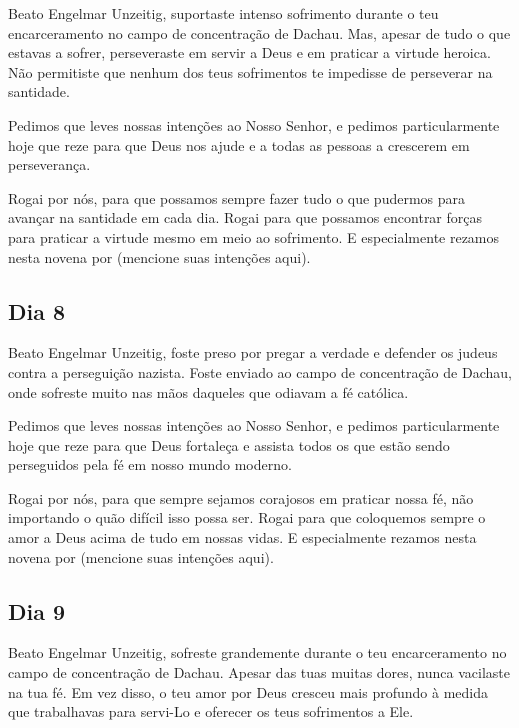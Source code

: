 \documentclass[a4paper,14pt]{extarticle} \usepackage[utf8]{inputenc}
\begin{document}
\underline{}

Beato Engelmar Unzeitig, suportaste intenso sofrimento durante o teu encarceramento no campo de concentração de Dachau. Mas, apesar de tudo o que estavas a sofrer, perseveraste em servir a Deus e em praticar a virtude heroica. Não permitiste que nenhum dos teus sofrimentos te impedisse de perseverar na santidade.

Pedimos que leves nossas intenções ao Nosso Senhor, e pedimos particularmente hoje que reze para que Deus nos ajude e a todas as pessoas a crescerem em perseverança. 

Rogai por nós, para que possamos sempre fazer tudo o que pudermos para avançar na santidade em cada dia. Rogai para que possamos encontrar forças para praticar a virtude mesmo em meio ao sofrimento. E especialmente rezamos nesta novena por (mencione suas intenções aqui).

\underline{}

\subsection{Dia 8}

\underline{}

Beato Engelmar Unzeitig, foste preso por pregar a verdade e defender os judeus contra a perseguição nazista. Foste enviado ao campo de concentração de Dachau, onde sofreste muito nas mãos daqueles que odiavam a fé católica.

Pedimos que leves nossas intenções ao Nosso Senhor, e pedimos particularmente hoje que reze para que Deus fortaleça e assista todos os que estão sendo perseguidos pela fé em nosso mundo moderno. 

Rogai por nós, para que sempre sejamos corajosos em praticar nossa fé, não importando o quão difícil isso possa ser. Rogai para que coloquemos sempre o amor a Deus acima de tudo em nossas vidas. E especialmente rezamos nesta novena por (mencione suas intenções aqui).


\underline{}

\subsection{Dia 9}

\underline{}

Beato Engelmar Unzeitig, sofreste grandemente durante o teu encarceramento no campo de concentração de Dachau. Apesar das tuas muitas dores, nunca vacilaste na tua fé. Em vez disso, o teu amor por Deus cresceu mais profundo à medida que trabalhavas para servi-Lo e oferecer os teus sofrimentos a Ele.
\end{document}
